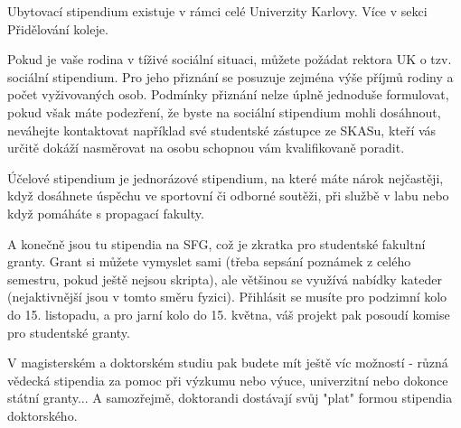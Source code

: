 Ubytovací stipendium existuje v rámci celé Univerzity Karlovy. Více v sekci Přidělování koleje.

Pokud je vaše rodina v tíživé sociální situaci, můžete požádat rektora UK o tzv. sociální stipendium. Pro jeho přiznání se posuzuje zejména výše příjmů rodiny a počet vyživovaných osob. Podmínky přiznání nelze úplně jednoduše formulovat, pokud však máte podezření, že byste na sociální stipendium mohli dosáhnout, neváhejte kontaktovat například své studentské zástupce ze SKASu, kteří vás určitě dokáží nasměrovat na osobu schopnou vám kvalifikovaně poradit.

Účelové stipendium je jednorázové stipendium, na které máte nárok nejčastěji, když dosáhnete úspěchu ve sportovní či odborné soutěži, při službě v labu nebo když pomáháte s propagací fakulty.

A konečně jsou tu stipendia na SFG, což je zkratka pro studentské fakultní granty. Grant si můžete vymyslet sami (třeba sepsání poznámek z celého semestru, pokud ještě nejsou skripta), ale většinou se využívá nabídky kateder (nejaktivnější jsou v tomto směru fyzici). Přihlásit se musíte pro podzimní kolo do 15. listopadu, a pro jarní kolo do 15. května, váš projekt pak posoudí komise pro studentské granty.

V magisterském a doktorském studiu pak budete mít ještě víc možností - různá vědecká stipendia za pomoc při výzkumu nebo výuce, univerzitní nebo dokonce státní granty... A samozřejmě, doktorandi dostávají svůj "plat" formou stipendia doktorského.